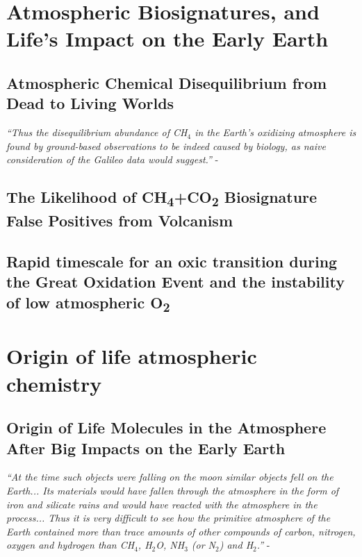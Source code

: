\documentclass[11pt, proquest]{uwthesis}[2016/11/22]
\begin{document}
\part{Atmospheric Biosignatures, and Life's Impact on the Early Earth} \label{pt:1}
 
\chapter{Atmospheric Chemical Disequilibrium from Dead to Living Worlds} \label{ch:2}
\noindent \emph{``Thus the disequilibrium abundance of CH$_4$ in the Earth's oxidizing atmosphere is found by ground-based observations to be indeed caused by biology, as naive consideration of the Galileo data would suggest.''} - \citet{Sagan_1993}
\newpage


\chapter{The Likelihood of CH\textsubscript{4}+CO\textsubscript{2} Biosignature False Positives from Volcanism} \label{ch:3}
\newpage


\chapter{Rapid timescale for an oxic transition during the Great Oxidation Event and the instability of low atmospheric O\textsubscript{2}} \label{ch:4}
\newpage


\part{Origin of life atmospheric chemistry} \label{pt:2}

\chapter{Origin of Life Molecules in the Atmosphere After Big Impacts on the Early Earth} \label{ch:5}
\noindent \emph{``At the time such objects were falling on the moon similar objects fell on the Earth... Its materials would have fallen through the atmosphere in the form of iron and silicate rains and would have reacted with the atmosphere in the process... Thus it is very difficult to see how the primitive atmosphere of the Earth contained more than trace amounts of other compounds of carbon, nitrogen, oxygen and hydrogen than CH$_4$, H$_2$O, NH$_3$ (or N$_2$) and H$_2$.''} - \citet{Urey_1952}
\newpage

\end{document}
